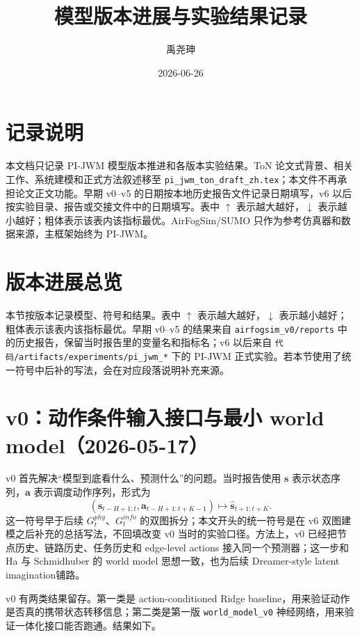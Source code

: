 \documentclass[UTF8,a4paper,11pt]{ctexart}
\title{\pjwm{} 模型版本进展与实验结果记录}
\author{禹尧珅}
\date{2026-06-26}
\newcommand{\code}[1]{\texttt{#1}}
\newcommand{\pjwm}{PI-JWM}
\begin{document}
\pagestyle{plain}
\maketitle
\section*{记录说明}
本文档只记录 \pjwm{} 模型版本推进和各版本实验结果。ToN 论文式背景、相关工作、系统建模和正式方法叙述移至 \code{pi\_jwm\_ton\_draft\_zh.tex}；本文件不再承担论文正文功能。早期 v0--v5 的日期按本地历史报告文件记录日期填写，v6 以后按实验目录、报告或交接文件中的日期填写。表中 $\uparrow$ 表示越大越好，$\downarrow$ 表示越小越好；粗体表示该表内该指标最优。AirFogSim/SUMO 只作为参考仿真器和数据来源，主框架始终为 \pjwm{}。
\section{版本进展总览}

本节按版本记录模型、符号和结果。表中 $\uparrow$ 表示越大越好，$\downarrow$ 表示越小越好；粗体表示该表内该指标最优。早期 v0--v5 的结果来自 \code{airfogsim\_v0/reports} 中的历史报告，保留当时报告里的变量名和指标名；v6 以后来自 \code{代码/artifacts/experiments/pi\_jwm\_*} 下的 PI-JWM 正式实验。若本节使用了统一符号中后补的写法，会在对应段落说明补充来源。

\section{v0：动作条件输入接口与最小 world model（2026-05-17）}

v0 首先解决“模型到底看什么、预测什么”的问题。当时报告使用 $\mathbf{s}$ 表示状态序列，$\mathbf{a}$ 表示调度动作序列，形式为
\[
(\mathbf{s}_{t-H+1:t},\mathbf{a}_{t-H+1:t+K-1})\mapsto \hat{\mathbf{s}}_{t+1:t+K}.
\]
这一符号早于后续 $G_t^{phy}$、$G_t^{info}$ 的双图拆分；本文开头的统一符号是在 v6 双图建模之后补充的总括写法，不回填改变 v0 当时的实验口径。方法上，v0 已经把节点历史、链路历史、任务历史和 edge-level actions 接入同一个预测器；这一步和 Ha 与 Schmidhuber 的 world model 思想一致，也为后续 Dreamer-style latent imagination铺路。

v0 有两类结果留存。第一类是 action-conditioned Ridge baseline，用来验证动作是否真的携带状态转移信息；第二类是第一版 \code{world\_model\_v0} 神经网络，用来验证一体化接口能否跑通。结果如下。

\begin{table}[H]
\centering
\small
{}
\caption{v0 动作条件 baseline 在 held-out seed 4 上的结果。}
\end{table}
\end{document}
